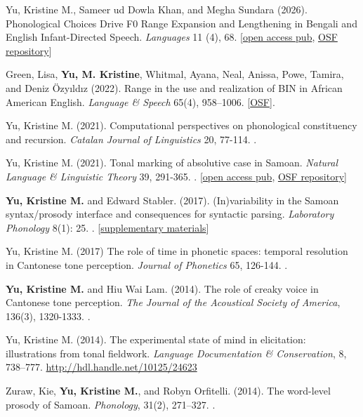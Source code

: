 \documentclass[10pt]{article}
\newcommand{\halfblankline}{\quad\vspace{-0.5\baselineskip}\pagebreak[3]}
\begin{document}
\halfblankline

\begin{bibenum}

\item Yu, Kristine M., Sameer ud Dowla Khan, and Megha Sundara (2026). Phonological Choices Drive F0 Range Expansion and Lengthening in Bengali and English Infant-Directed Speech. \emph{Languages} 11 (4), 68.  [\href{https://www.mdpi.com/2226-471X/11/4/68}{open access pub}{, \href{https://osf.io/7jhd3/overview}{OSF repository}}]

\item Green, Lisa, \textbf{Yu, M. Kristine}, Whitmal, Ayana, Neal, Anissa, Powe, Tamira, and Deniz \"{O}zy\i{}ld\i{}z (2022). Range in the use and realization of BIN in African American English. \emph{Language \& Speech} 65(4), 958–1006.  [\href{https://www.doi.org/10.17605/OSF.IO/MRQBV}{OSF}].

\item Yu, Kristine M. (2021). Computational perspectives on phonological constituency and recursion. \emph{Catalan Journal of Linguistics} 20, 77-114. .

\item Yu, Kristine M. (2021). Tonal marking of absolutive case in Samoan. \emph{Natural Language \& Linguistic Theory} 39, 291-365. . [\href{https://link.springer.com/article/10.1007\%2Fs11049-020-09470-2}{open access pub}, \href{https://osf.io/8cvg5/?view\_only=e9be8cb15097493897b826f53487e345}{OSF repository}]

\item \textbf{Yu, Kristine M.} and Edward Stabler. (2017). (In)variability in the Samoan syntax/prosody interface and consequences for syntactic parsing. \emph{Laboratory Phonology} 8(1): 25. . [\href{https://doi.org/10.5334/labphon.113.s1}{supplementary materials}]

\item Yu, Kristine M. (2017) The role of time in phonetic spaces: temporal resolution in Cantonese tone perception. \emph{Journal of Phonetics} 65, 126-144. .

\item \textbf{Yu, Kristine M.} and Hiu Wai Lam. (2014). The role of creaky voice in Cantonese tone perception. \emph{The Journal of the Acoustical Society of America}, 136(3), 1320-1333. .

    \item Yu, Kristine M. (2014). The experimental state of mind in elicitation: illustrations from tonal fieldwork. \emph{Language Documentation \& Conservation}, 8, 738--777. \url{http://hdl.handle.net/10125/24623}

    \item Zuraw, Kie, \textbf{Yu, Kristine M.}, and Robyn Orfitelli. (2014). The word-level prosody of
      {S}amoan. \emph{Phonology}, 31(2), 271--327. .

\end{bibenum}
\end{document}
